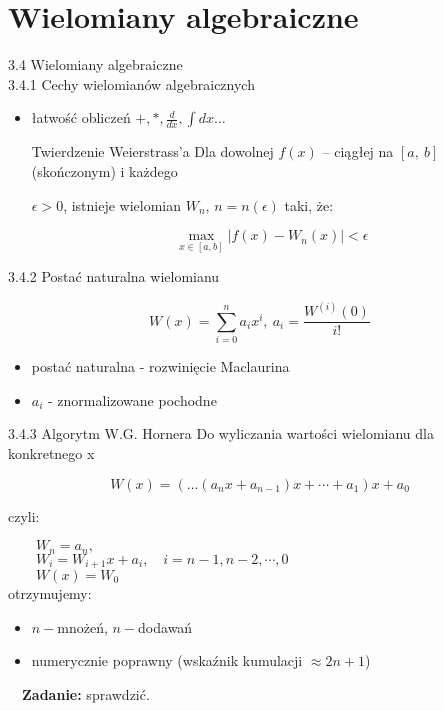 \section{Wielomiany algebraiczne}
	\begin{frame}{3.4 Wielomiany algebraiczne \\ 3.4.1 Cechy wielomianów algebraicznych}


	\begin{itemize}
	\item łatwość obliczeń $+, *, \displaystyle \frac{d}{dx}, \displaystyle \int dx\ldots $ \newline


    \begin{block}{Twierdzenie Weierstrass'a}
    Dla dowolnej $f(x)$ -- ciągłej na $[a,\ b]$ (skończonym) i każdego

    $\epsilon>0$, istnieje wielomian $W_{n}$, $n=n(\epsilon)$ taki, że:

	\[ \max\limits_{x \in [a,b]}|f(x)-W_{n}(x)|<\epsilon \]


  	\end{block}
    \end{itemize}

	\end{frame}

    \begin{frame}{3.4.2 Postać naturalna wielomianu}
    \begin{block}{}
		$$W(x)=\sum_{i=0}^{n}a_{i}x^{i},\ a_{i}=\frac{W^{(i)}(0)}{i!}$$
    \end{block}
        \begin{itemize}
        \item postać naturalna - rozwinięcie Maclaurina \\

        \item $a_{i}$ - znormalizowane pochodne
		\end{itemize}
    \end{frame}

    \begin{frame}{3.4.3 Algorytm W.G. Hornera}
    Do wyliczania wartości wielomianu dla konkretnego x
    \setlength\parindent{24pt}
	\begin{block}{}
		$$W(x)=(\ldots(a_{n}x+a_{n-1})x+\cdots+a_{1})x+a_{0}$$
	\end{block}
	czyli:

	$\qquad W_{n}=a_{n},$ \\

	$\qquad W_{i}=W_{i+1}x+a_{i}, \quad i=n-1, n-2, \cdots , 0$ \\

	$\qquad W(x)=W_{0}$ \\

	otrzymujemy:
	\begin{itemize}
	\item $n-$mnożeń, $n -$dodawań
	\item numerycznie poprawny (wskaźnik kumulacji $\approx 2n+1$)
	\end{itemize}
    \vspace{3mm}
	$\quad$\textbf{Zadanie:} sprawdzić.
    \end{frame}

